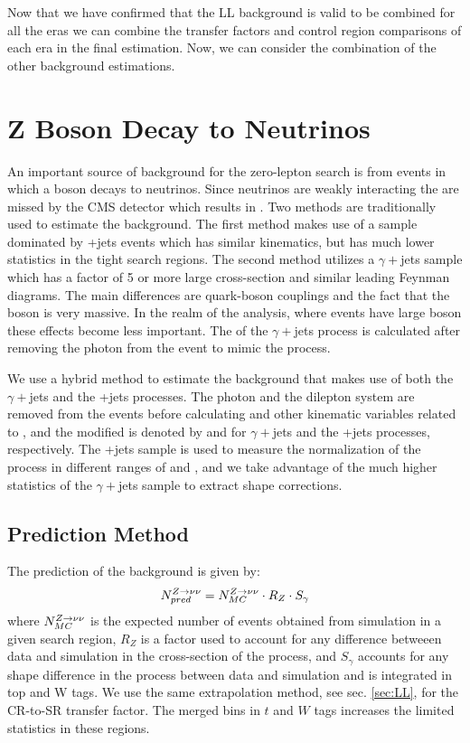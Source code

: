 Now that we have confirmed that the LL background is valid to be combined for all the eras we can combine the transfer factors and control region comparisons of each era in the final estimation. Now, we can consider the combination of the other background estimations. 

\section{Z Boson Decay to Neutrinos}
\label{sec:Znunu}

An important source of background for the zero-lepton search is from events in which a \Z{} boson decays to neutrinos. Since neutrinos are weakly interacting the are missed by the CMS detector which results in \met. Two methods are traditionally used to estimate the \Znunu{} background. The first method makes use of a sample dominated by \Zll+jets events which has similar kinematics, but has much lower statistics in the tight search regions. The second method utilizes a $\gamma+$jets sample which has a factor of 5 or more large cross-section and similar leading Feynman diagrams. The main differences are quark-boson couplings and the fact that the \Z{} boson is very massive. In the realm of the analysis, where events have large boson \pt{} these effects become less important. The \met{} of the $\gamma+$jets process is calculated after removing the photon from the event to mimic the \Znunu{} process.

We use a hybrid method to estimate the \Znunu{} background that makes use of both the $\gamma+$jets and the \Zll+jets processes. The photon and the dilepton system are removed from the events before calculating \met{} and other kinematic variables related to \met, and the modified \met{} is denoted by \metgamma{} and \metll{} for $\gamma+$jets and the \Zll+jets processes, respectively. The \Zll+jets sample is used to measure the normalization of the \Znunu{} process in different ranges of \nb{} and \nsv, and we take advantage of the much higher statistics of the $\gamma+$jets sample to extract shape corrections. 

\subsection{Prediction Method}\label{subsec:znunupred}

The prediction of the \Znunu{} background is given by:
\begin{equation}
N_{pred}^{Z\rightarrow\nu\nu}=N_{MC}^{Z\rightarrow\nu\nu} \cdot R_Z \cdot S_\gamma
\end{equation}
where $N_{MC}^{Z\rightarrow\nu\nu}$ is the expected number of \Znunu{} events obtained from simulation in a given search region, $R_Z$ is a factor used to account for any difference betweeen data and simulation in the cross-section of the \Znunu{} process, and $S_\gamma$ accounts for any shape difference in the \Znunu{} process between data and simulation and is integrated in top and W tags. We use the same extrapolation method, see sec. \ref{sec:LL}, for the CR-to-SR transfer factor. The merged bins in $t$ and $W$ tags increases the limited statistics in these regions. 

